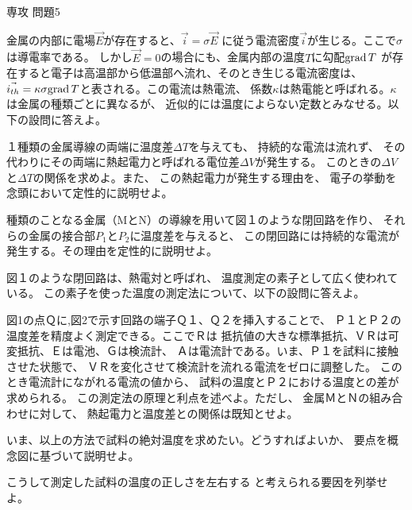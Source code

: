 \documentclass[fleqn]{jbook}
\begin{document}
\begin{question}{専攻 問題5}{}

\begin{subquestions}

\SubQuestion
金属の内部に電場$\vec{E}$が存在すると、$\vec{i} = \sigma \vec{E}$
に従う電流密度$\vec{i}$が生じる。ここで$\sigma $は導電率である。
しかし$\vec{E} = 0 $の場合にも、金属内部の温度$T$に勾配${\rm grad\,}T$
が存在すると電子は高温部から低温部へ流れ、そのとき生じる電流密度は、
$\vec{i_{th}}=\kappa \sigma {\rm grad\,}T$と表される。この電流は熱電流、
係数$\kappa$は熱電能と呼ばれる。$\kappa$は金属の種類ごとに異なるが、
近似的には温度によらない定数とみなせる。以下の設問に答えよ。

\begin{subsubquestions}
\SubSubQuestion
１種類の金属導線の両端に温度差$\Delta T$を与えても、
持続的な電流は流れず、
その代わりにその両端に熱起電力と呼ばれる電位差$\Delta V$が発生する。
このときの$\Delta V$と$\Delta T$の関係を求めよ。また、
この熱起電力が発生する理由を、
電子の挙動を念頭において定性的に説明せよ。

\SubSubQuestion
種類のことなる金属（MとN）の導線を用いて図１のような閉回路を作り、
それらの金属の接合部$P_1$と$P_2$に温度差を与えると、
この閉回路には持続的な電流が発生する。その理由を定性的に説明せよ。

\end{subsubquestions}
\SubQuestion
図１のような閉回路は、熱電対と呼ばれ、
温度測定の素子として広く使われている。
この素子を使った温度の測定法について、以下の設問に答えよ。
\begin{subsubquestions}
\SubSubQuestion
図1の点Ｑに,図2で示す回路の端子Ｑ１、Ｑ２を挿入することで、
Ｐ１とＰ２の温度差を精度よく測定できる。ここでＲは
抵抗値の大きな標準抵抗、ＶＲは可変抵抗、Ｅは電池、Ｇは検流計、
Ａは電流計である。いま、Ｐ１を試料に接触させた状態で、
ＶＲを変化させて検流計を流れる電流をゼロに調整した。
このとき電流計にながれる電流の値から、
試料の温度とＰ２における温度との差が求められる。
この測定法の原理と利点を述べよ。ただし、
金属ＭとＮの組み合わせに対して、
熱起電力と温度差との関係は既知とせよ。

\SubSubQuestion
いま、以上の方法で試料の絶対温度を求めたい。どうすればよいか、
要点を概念図に基づいて説明せよ。

\SubSubQuestion
こうして測定した試料の温度の正しさを左右する
と考えられる要因を列挙せよ。


\end{subsubquestions}
\end{subquestions}
\end{question}
\end{document}
